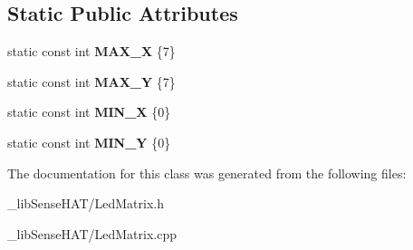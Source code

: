 \subsection*{Static Public Attributes}
\begin{DoxyCompactItemize}
\item 
static const int {\bfseries M\+A\+X\+\_\+X} \{7\}\hypertarget{class_led_matrix_a6da341535a246a5395b0a46569618830}{}\label{class_led_matrix_a6da341535a246a5395b0a46569618830}

\item 
static const int {\bfseries M\+A\+X\+\_\+Y} \{7\}\hypertarget{class_led_matrix_aa6cf03e172a1efe233aaac293be202bd}{}\label{class_led_matrix_aa6cf03e172a1efe233aaac293be202bd}

\item 
static const int {\bfseries M\+I\+N\+\_\+X} \{0\}\hypertarget{class_led_matrix_a30e3af90d4c9a83aec44e71914f86aa3}{}\label{class_led_matrix_a30e3af90d4c9a83aec44e71914f86aa3}

\item 
static const int {\bfseries M\+I\+N\+\_\+Y} \{0\}\hypertarget{class_led_matrix_a4bb052cfec297bc54387decb20a0f17f}{}\label{class_led_matrix_a4bb052cfec297bc54387decb20a0f17f}

\end{DoxyCompactItemize}


The documentation for this class was generated from the following files\+:\begin{DoxyCompactItemize}
\item 
\+\_\+lib\+Sense\+H\+A\+T/Led\+Matrix.\+h\item 
\+\_\+lib\+Sense\+H\+A\+T/Led\+Matrix.\+cpp\end{DoxyCompactItemize}
